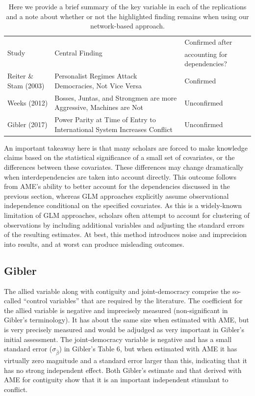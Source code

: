 \begin{table}[ht]
\centering
\caption{Here we provide a brief summary of the key variable in each of the replications and a note about whether or not the highlighted finding remains when using our network-based approach.}
	\begin{tabular}{l p{7cm} l} \toprule
		\multirow{2}{*}{Study} & \multirow{2}{*}{Central Finding} &  Confirmed after \\
		& &  accounting for dependencies? \\ \toprule
		Reiter \& Stam (2003) & Personalist Regimes Attack Democracies, Not Vice Versa & {Confirmed} \\ \midrule
		Weeks (2012) & Bosses, Juntas, and Strongmen are more Aggressive, Machines are Not & {Unconfirmed} \\\midrule
		Gibler (2017) & Power Parity at Time of Entry to International System Increases Conflict & {Unconfirmed}\\ \bottomrule
	\end{tabular}
	\label{tab:modelFindingSumm}
\end{table}

An important takeaway here is that many scholars are forced to make knowledge claims based on the statistical significance of a small set of covariates, or the differences between these covariates. These differences may change dramatically when interdependencies are taken into account directly. This outcome follows from AME's ability to better account for the dependencies discussed in the previous section, whereas GLM approaches explicitly assume observational independence conditional on the specified covariates. As this is a widely-known limitation of GLM approaches, scholars often attempt to account for clustering of observations by including additional variables and adjusting the standard errors of the resulting estimates. At best, this method introduces noise and imprecision into results, and at worst can produce misleading outcomes. 

\subsection{Gibler}
The allied variable along with contiguity and joint-democracy comprise the so-called ``control variables'' that are required by the literature. The coefficient for the allied variable is negative and imprecisely measured (non-significant in Gibler's terminology). It has about the same size when estimated with AME, but is very precisely measured and would be adjudged as very important in Gibler's initial assessment.   The joint-democracy variable is negative and has a small standard error ($\sigma_{\hat{\beta}}$) in Gibler's Table 6, but when estimated with AME it has virtually zero magnitude and a standard error larger than this, indicating that it has no strong independent effect. Both Gibler's estimate and that derived with AME for contiguity show that it is an important independent stimulant to conflict. 

